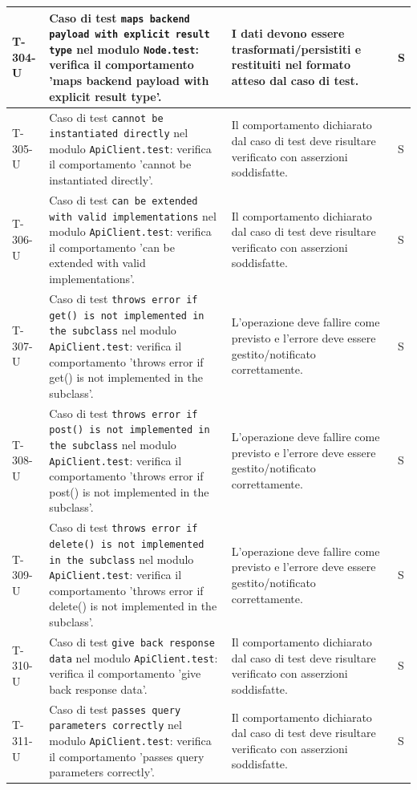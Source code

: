 \documentclass[a4paper,12pt]{article}
\begin{document}
{{\begin{longtable}{|>{\RaggedRight\arraybackslash}p{1.55cm}|>{\RaggedRight\arraybackslash}p{8.0cm}|>{\RaggedRight\arraybackslash}p{4.6cm}|>{\RaggedRight\arraybackslash}p{1.2cm}|}
        \hline
        T-304-U & Caso di test \texttt{maps backend payload with explicit result type} nel modulo \texttt{Node.test}: verifica il comportamento 'maps backend payload with explicit result type'. & I dati devono essere trasformati/persistiti e restituiti nel formato atteso dal caso di test. & S \\
        \hline
        T-305-U & Caso di test \texttt{cannot be instantiated directly} nel modulo \texttt{ApiClient.test}: verifica il comportamento 'cannot be instantiated directly'. & Il comportamento dichiarato dal caso di test deve risultare verificato con asserzioni soddisfatte. & S \\
        \hline
        T-306-U & Caso di test \texttt{can be extended with valid implementations} nel modulo \texttt{ApiClient.test}: verifica il comportamento 'can be extended with valid implementations'. & Il comportamento dichiarato dal caso di test deve risultare verificato con asserzioni soddisfatte. & S \\
        \hline
        T-307-U & Caso di test \texttt{throws error if get() is not implemented in the subclass} nel modulo \texttt{ApiClient.test}: verifica il comportamento 'throws error if get() is not implemented in the subclass'. & L'operazione deve fallire come previsto e l'errore deve essere gestito/notificato correttamente. & S \\
        \hline
        T-308-U & Caso di test \texttt{throws error if post() is not implemented in the subclass} nel modulo \texttt{ApiClient.test}: verifica il comportamento 'throws error if post() is not implemented in the subclass'. & L'operazione deve fallire come previsto e l'errore deve essere gestito/notificato correttamente. & S \\
        \hline
        T-309-U & Caso di test \texttt{throws error if delete() is not implemented in the subclass} nel modulo \texttt{ApiClient.test}: verifica il comportamento 'throws error if delete() is not implemented in the subclass'. & L'operazione deve fallire come previsto e l'errore deve essere gestito/notificato correttamente. & S \\
        \hline
        T-310-U & Caso di test \texttt{give back response data} nel modulo \texttt{ApiClient.test}: verifica il comportamento 'give back response data'. & Il comportamento dichiarato dal caso di test deve risultare verificato con asserzioni soddisfatte. & S \\
        \hline
        T-311-U & Caso di test \texttt{passes query parameters correctly} nel modulo \texttt{ApiClient.test}: verifica il comportamento 'passes query parameters correctly'. & Il comportamento dichiarato dal caso di test deve risultare verificato con asserzioni soddisfatte. & S \\

\end{longtable}}}
\end{document}
